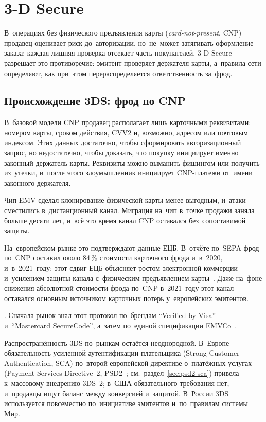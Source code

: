 
\chapter{3-D Secure}\label{ch:3ds}
В~операциях без физического предъявления карты (\textit{card-not-present}, CNP) продавец
оценивает риск до~авторизации, но~не~может затягивать оформление заказа:
каждая лишняя проверка отсекает часть покупателей. 3-D Secure
разрешает это противоречие: эмитент проверяет держателя карты,
а~правила сети определяют, как при~этом перераспределяется ответственность
за~фрод.

\section{Происхождение 3DS: фрод по CNP}\label{sec:3ds-cnp-fraud}

В~базовой модели CNP продавец располагает лишь карточными реквизитами: номером
карты, сроком действия, CVV2 и, возможно, адресом или почтовым индексом. Этих
данных достаточно, чтобы сформировать авторизационный запрос, но недостаточно,
чтобы доказать, что покупку инициирует именно законный держатель карты.
Реквизиты можно выманить фишингом или получить из~утечки, и~после этого
злоумышленник инициирует CNP-платежи от~имени законного держателя.

Чип EMV сделал клонирование физической карты менее выгодным, и~атаки
сместились в~дистанционный канал. Миграция на~чип в~точке продажи заняла
больше десяти лет, и~всё это время канал CNP оставался без~сопоставимой
защиты.

На~европейском рынке это подтверждают данные ЕЦБ. В~отчёте по~SEPA фрод по~CNP
составил около 84\,\% стоимости карточного фрода и~в~2020,
и~в~2021~году; этот сдвиг ЕЦБ объясняет ростом электронной коммерции и~усилением
защиты канала с~физическим предъявлением карты~\cite{ecb-card-fraud-2021}. Даже
на~фоне снижения абсолютной стоимости фрода по~CNP в~2021~году этот канал
оставался основным источником карточных потерь у~европейских эмитентов.

.
Сначала рынок знал этот протокол по~брендам \enquote{Verified by Visa}
и~\enquote{Mastercard SecureCode}, а~затем по~единой спецификации
EMVCo~\cite{emvco-3ds-whitepaper}.

Распространённость 3DS по~рынкам остаётся неоднородной. В~Европе
обязательность усиленной аутентификации плательщика (Strong Customer
Authentication, SCA) по~второй европейской директиве о~платёжных услугах
(Payment Services Directive~2, PSD2~\cite{psd2}; см.~раздел~\ref{sec:psd2-sca})
привела к~массовому внедрению 3DS~2; в~США обязательного требования нет,
и~продавцы ищут баланс между конверсией и~защитой. В~России
3DS используется повсеместно по~инициативе эмитентов и~по~правилам системы Мир.

